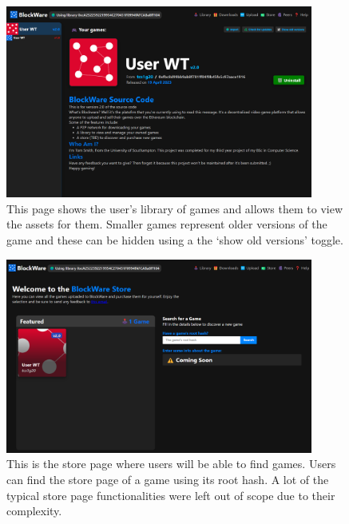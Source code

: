 \begin{figure}[H]
  \centering
  \includegraphics[width=0.9\textwidth]{assets/images/screenshots/library.png}
  \caption{This page shows the user's library of games and allows them to view the assets for them. Smaller games represent older versions of the game and these can be hidden using a the `show old versions' toggle.}
\end{figure}

\begin{figure}[H]
  \centering
  \includegraphics[width=0.9\textwidth]{assets/images/screenshots/store.png}
  \caption{This is the store page where users will be able to find games. Users can find the store page of a game using its root hash. A lot of the typical store page functionalities were left out of scope due to their complexity.}
\end{figure}






